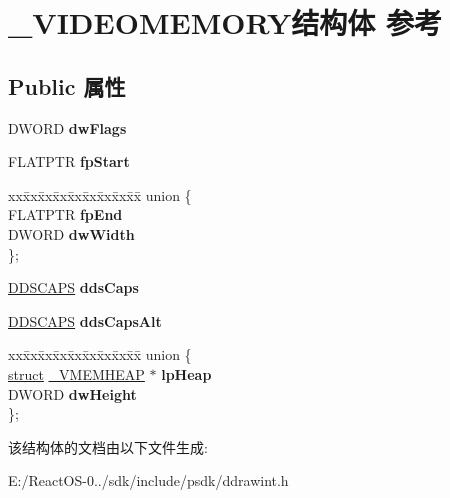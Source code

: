 \hypertarget{struct___v_i_d_e_o_m_e_m_o_r_y}{}\section{\+\_\+\+V\+I\+D\+E\+O\+M\+E\+M\+O\+R\+Y结构体 参考}
\label{struct___v_i_d_e_o_m_e_m_o_r_y}
\subsection*{Public 属性}
\begin{DoxyCompactItemize}
\item 
\mbox{\label{struct___v_i_d_e_o_m_e_m_o_r_y_a27f93359e794eceb2a75ed301717e5d7}} 
D\+W\+O\+RD {\bfseries dw\+Flags}
\item 
\mbox{\label{struct___v_i_d_e_o_m_e_m_o_r_y_aa7560c4ac0672a060bfe2a267f6fb61a}} 
F\+L\+A\+T\+P\+TR {\bfseries fp\+Start}
\item 
\mbox{\label{struct___v_i_d_e_o_m_e_m_o_r_y_a06536f2c245a6434d5b98c0d535bf563}} 
\begin{tabbing}
xx\=xx\=xx\=xx\=xx\=xx\=xx\=xx\=xx\=\kill
union \{\\
\>FLATPTR {\bfseries fpEnd}\\
\>DWORD {\bfseries dwWidth}\\
\}; \\

\end{tabbing}\item 
\mbox{\label{struct___v_i_d_e_o_m_e_m_o_r_y_afc4b06967e59e7a71eb81d90dd6114d6}} 
\hyperlink{struct___d_d_s_c_a_p_s}{D\+D\+S\+C\+A\+PS} {\bfseries dds\+Caps}
\item 
\mbox{\label{struct___v_i_d_e_o_m_e_m_o_r_y_a6c4c1f135a3c0897d2e678a589a37835}} 
\hyperlink{struct___d_d_s_c_a_p_s}{D\+D\+S\+C\+A\+PS} {\bfseries dds\+Caps\+Alt}
\item 
\mbox{\label{struct___v_i_d_e_o_m_e_m_o_r_y_a980924aa3d940860c5cf68cc793b22bd}} 
\begin{tabbing}
xx\=xx\=xx\=xx\=xx\=xx\=xx\=xx\=xx\=\kill
union \{\\
\>\hyperlink{interfacestruct}{struct} \hyperlink{struct___v_m_e_m_h_e_a_p}{\_VMEMHEAP} $\ast$ {\bfseries lpHeap}\\
\>DWORD {\bfseries dwHeight}\\
\}; \\

\end{tabbing}\end{DoxyCompactItemize}


该结构体的文档由以下文件生成\+:\begin{DoxyCompactItemize}
\item 
E\+:/\+React\+O\+S-\/0../sdk/include/psdk/ddrawint.\+h\end{DoxyCompactItemize}
